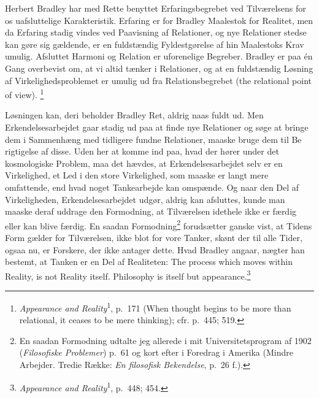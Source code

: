 \documentclass[12pt]{article}
\newcommand{\opage}[1]{\marginnote{\footnotesize\textit{[#1]}}}
\begin{document}
Herbert Bradley har med Rette benyttet Erfaringsbegrebet ved
Tilværelsens for os uafsluttelige Karakteristik. Erfaring er for Bradley
Maalestok for Realitet, men da Erfaring stadig vindes ved Paavisning af
Relationer, og nye Relationer stedse kan gøre sig gældende, er en
fuldstændig Fyldestgørelse af hin Maalestoks Krav umulig. Afsluttet
Harmoni og Relation er uforenelige Begreber. Bradley er paa én Gang
overbevist om, at vi altid tænker i Relationer, og at en fuldstændig
Løsning af Virkelighedsproblemet er umulig ud fra Relationsbegrebet (the
relational point of view).%
\footnote{\textit{Appearance and Reality}\textsuperscript{1}, p.~171
(When thought begins to be more than relational, it ceases to be mere
thinking); cfr. p.~445; 519.}

Løsningen kan, deri beholder Bradley Ret, aldrig naas fuldt ud. Men
Erkendelsesarbejdet gaar stadig ud paa at finde nye Relationer og søge
at bringe dem i Sammenhæng med tidligere fundne Relationer, maaske bruge
dem til Be%
\opage{49}\setcounter{footnote}{0}%
rigtigelse af disse. Uden her at komme ind paa, hvad der hører under det
kosmologiske Problem, maa det hævdes, at Erkendelsesarbejdet selv er en
Virkelighed, et Led i den store Virkelighed, som maaske er langt mere
omfattende, end hvad noget Tankearbejde kan omspænde. Og naar den Del af
Virkeligheden, Erkendelsesarbejdet udgør, aldrig kan afsluttes, kunde
man maaske deraf uddrage den Formodning, at Tilværelsen idethele ikke er
færdig eller kan blive færdig. En saadan
Formodning\footnote{En saadan Formodning udtalte jeg allerede i mit
Universitetsprogram af 1902 (\textit{Filosofiske Problemer}) p.~61 og
kort efter i Foredrag i Amerika (Mindre Arbejder. Tredie Række:
\textit{En filosofisk Bekendelse}, p.~26 f.).} forudsætter ganske vist,
at Tidens Form gælder for Tilværelsen, ikke blot for vore Tanker, skønt
der til alle Tider, ogsaa nu, er Forskere, der ikke antager dette. Hvad
Bradley angaar, nægter han bestemt, at Tanken er en Del af Realiteten:
The process which moves within Reality, is not Reality itself.
Philosophy is itself but
appearance.\footnote{\textit{Appearance and
Reality}\textsuperscript{1}, p.~448; 454.}
\end{document}
